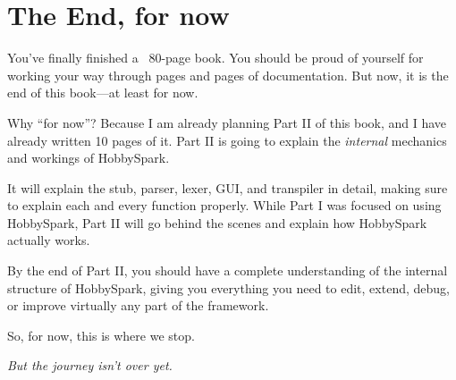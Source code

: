 \documentclass[11pt]{book}
\begin{document}
	\chapter{The End, for now}

You've finally finished a ~80-page book. You should be proud of yourself for
working your way through pages and pages of documentation. But now, it is the
end of this book---at least for now.

Why ``for now''? Because I am already planning Part II of this book, and I
have already written 10 pages of it. Part II is going to explain the
\emph{internal} mechanics and workings of HobbySpark.

It will explain the stub, parser, lexer, GUI, and transpiler in detail,
making sure to explain each and every function properly. While Part I was
focused on using HobbySpark, Part II will go behind the scenes and explain
how HobbySpark actually works.

By the end of Part II, you should have a complete understanding of the
internal structure of HobbySpark, giving you everything you need to edit,
extend, debug, or improve virtually any part of the framework.

So, for now, this is where we stop.

\bigskip

\begin{center}
    \emph{But the journey isn't over yet.}
\end{center}
\end{document}
